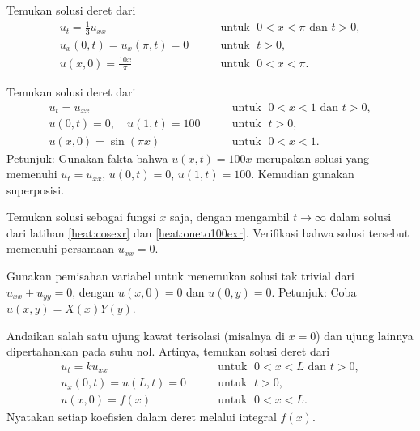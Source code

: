\begin{exercise} \label{heat:cosexr}
Temukan solusi deret dari
\begin{equation*}
\begin{array}{ll}
u_t = \frac{1}{3} u_{xx} & \qquad \text{untuk } \; 0 < x < \pi \text{ dan } t > 0, \\
u_x(0,t) = u_x(\pi,t) = 0 & \qquad \text{untuk } \; t > 0, \\
u(x,0) = \frac{10x}{\pi} & \qquad \text{untuk } \; 0 < x < \pi .
\end{array}
\end{equation*}
\end{exercise}

\begin{exercise} \label{heat:oneto100exr}
Temukan solusi deret dari
\begin{equation*}
\begin{array}{ll}
u_t =  u_{xx} & \qquad \text{untuk } \; 0 < x < 1 \text{ dan } t > 0, \\
u(0,t) = 0 , \quad u(1,t) = 100 & \qquad \text{untuk } \; t > 0, \\
u(x,0) = \sin (\pi x) & \qquad \text{untuk } \; 0 < x < 1 .
\end{array}
\end{equation*}
Petunjuk: Gunakan fakta bahwa $u(x,t) = 100 x$ merupakan solusi yang memenuhi
$u_t = u_{xx}$, $u(0,t) = 0$, $u(1,t) = 100$.  Kemudian gunakan superposisi.
\end{exercise}

\begin{exercise}
Temukan solusi \emph{} sebagai fungsi
$x$ saja,
dengan mengambil $t \to
\infty$ dalam solusi dari
latihan \ref{heat:cosexr} dan \ref{heat:oneto100exr}.
Verifikasi bahwa solusi tersebut memenuhi persamaan $u_{xx} = 0$.
\end{exercise}

\begin{exercise}
Gunakan pemisahan variabel untuk menemukan solusi tak trivial
dari $u_{xx} + u_{yy} = 0$, dengan $u(x,0) = 0$ dan $u(0,y) = 0$.
Petunjuk: Coba $u(x,y) = X(x)Y(y)$.
\end{exercise}

\begin{exercise}[menantang]
Andaikan salah satu ujung kawat terisolasi (misalnya di $x=0$) dan
ujung lainnya dipertahankan pada suhu nol.  Artinya,
temukan solusi deret dari
\begin{equation*}
\begin{array}{ll}
u_t = k u_{xx} & \qquad \text{untuk } \; 0 < x < L \text{ dan } t > 0, \\
u_x(0,t) = u(L,t) = 0  & \qquad \text{untuk } \; t > 0, \\
u(x,0) = f(x) & \qquad \text{untuk } \; 0 < x < L .
\end{array}
\end{equation*}
Nyatakan setiap koefisien dalam deret melalui integral $f(x)$.
\end{exercise}

